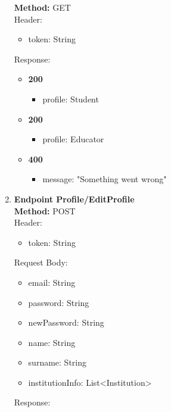 \begin{enumerate}
    \textbf{Method:} GET \\
    Header:\\
    \begin{itemize}
        \item token: String
    \end{itemize}
    Response:\\
    \begin{itemize}
        \item \textbf{200} \\
        \begin{itemize}
            \item profile: Student
        \end{itemize}
        \item \textbf{200} \\
        \begin{itemize}
            \item profile: Educator
        \end{itemize}
        \item \textbf{400} \\
        \begin{itemize}
            \item message: "Something went wrong"
        \end{itemize}
    \end{itemize}
    \item \textbf{Endpoint Profile/EditProfile} \\
    \textbf{Method:} POST \\
    Header:\\
    \begin{itemize}
        \item token: String
    \end{itemize}
    Request Body: \\
    \begin{itemize}
        \item email: String
        \item password: String
        \item newPassword: String
        \item name: String
        \item surname: String
        \item institutionInfo: List<Institution>
    \end{itemize}
    Response:\\
    \begin{itemize}

\end{itemize}
\end{enumerate}
